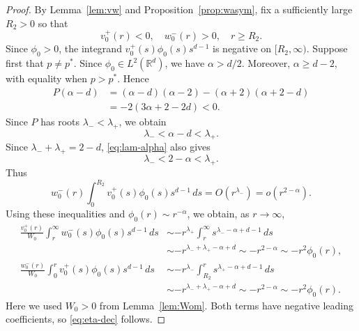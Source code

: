 \documentclass[12pt, a4paper, reqno]{amsart}
\numberwithin{equation}{section}
\theoremstyle{definition}
\theoremstyle{remark}
\newcommand{\R}{\mathbb R}
\begin{document}
\begin{proof}
By Lemma~\ref{lem:vw} and Proposition~\ref{prop:wasym}, fix a
sufficiently large $R_2>0$ so that
\[
  v_0^+(r)<0,\quad w_0^-(r)>0,\quad r\ge R_2.
\]
Since $\phi_0>0$, the integrand
$v_0^+(s)\phi_0(s)s^{d-1}$ is negative on $[R_2,\infty)$.
Suppose first that $p\ne p^*$.
Since $\phi_0\in L^2(\R^d)$, we have $\alpha>d/2$.
Moreover, $\alpha\ge d-2$, with equality when $p>p^*$.
Hence
\begin{align*}
  P(\alpha-d)
  &=(\alpha-d)(\alpha-2)
    -(\alpha+2)(\alpha+2-d)\\
  &=-2(3\alpha+2-2d)<0.
\end{align*}
Since $P$ has roots $\lambda_-<\lambda_+$, we obtain
\begin{equation}\label{eq:lam-alpha}
  \lambda_-<\alpha-d<\lambda_+.
\end{equation}
Since $\lambda_-+\lambda_+=2-d$,
\eqref{eq:lam-alpha} also gives
\begin{equation}\label{eq:lam-alpha2}
  \lambda_-<2-\alpha<\lambda_+.
\end{equation}
Thus
\[
  w_0^-(r)\int_0^{R_2}v_0^+(s)\phi_0(s)s^{d-1}\,ds
  =O(r^{\lambda_-})=o(r^{2-\alpha}).
\]
Using these inequalities and $\phi_0(r)\sim r^{-\alpha}$, we obtain,
as $r\to\infty$,
\begin{align*}
  \frac{v_0^+(r)}{W_0}
  \int_r^\infty w_0^-(s)\phi_0(s)s^{d-1}\,ds
  &\sim-r^{\lambda_+}
       \int_r^\infty s^{\lambda_--\alpha+d-1}\,ds
\\&\sim-r^{\lambda_-+\lambda_+-\alpha+d}
       \sim-r^{2-\alpha}\sim-r^2\phi_0(r),
\\
  \frac{w_0^-(r)}{W_0}
  \int_0^r v_0^+(s)\phi_0(s)s^{d-1}\,ds
  &\sim-r^{\lambda_-}
       \int_{R_2}^r s^{\lambda_+-\alpha+d-1}\,ds
\\&\sim-r^{\lambda_-+\lambda_+-\alpha+d}
       \sim-r^{2-\alpha}\sim-r^2\phi_0(r).
\end{align*}
Here we used $W_0>0$ from Lemma~\ref{lem:Wom}. Both terms have
negative leading coefficients, so \eqref{eq:eta-dec} follows.


\end{proof}
\end{document}
